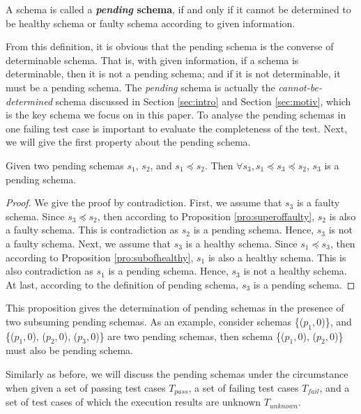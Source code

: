 \begin{definition}\label{de:pending}
A schema is called a \textbf{\emph{pending} schema}, if and only if it cannot be determined to be healthy schema or faulty schema according to given information.
\end{definition}


From this definition, it is obvious that the pending schema is the converse of determinable schema. That is, with given information, if a schema is determinable, then it is not a pending schema; and if it is not determinable, it must be a pending schema. The \emph{pending} schema is actually the \emph{cannot-be-determined} schema discussed in Section \ref{sec:intro} and Section \ref{sec:motiv}, which is the key schema we focus on in this paper. To analyse the pending schemas in one failing test case is important to evaluate the completeness of the test.  Next, we will give the first property about the pending schema.

\begin{proposition}\label{pro:pendingsandwich}
Given two pending schemas $s_{1}$, $s_{2}$, and $s_{1} \preceq s_{2}$. Then $\forall s_{3}, s_{1} \preceq s_{3} \preceq s_{2}$, $s_{3}$ is a pending schema.
\end{proposition}

\begin{proof}
We give the proof by contradiction. First, we assume that $s_{3}$ is a faulty schema. Since $s_{3} \preceq s_{2}$, then according to Proposition \ref{pro:superoffaulty}, $s_{2}$ is also a faulty schema. This is contradiction as $s_{2}$ is a pending schema. Hence, $s_{3}$ is not a faulty schema. Next, we assume that $s_{3}$ is a healthy schema.  Since $s_{1} \preceq s_{3}$, then according to Proposition \ref{pro:subofhealthy}, $s_{1}$ is also a healthy schema. This is also contradiction as $s_{1}$ is a pending schema.  Hence, $s_{3}$ is not a healthy schema. At last, according to the definition of pending schema, $s_{3}$ is a pending schema.
\end{proof}

This proposition gives the determination of pending schemas in the presence of two subsuming pending schemas. As an example, consider schemas \{($p_{1}, 0$)\}, and \{($p_{1}, 0$), ($p_{2}, 0$), ($p_{3}, 0$)\} are two pending schemas, then schema \{($p_{1}, 0$), ($p_{2}, 0$)\} must also be pending schema.

Similarly as before, we will discuss the pending schemas under the circumstance when given a set of passing test cases $T_{pass}$, a set of failing test cases $T_{fail}$, and a set of test cases of which the execution results are unknown $T_{unknown}$.

